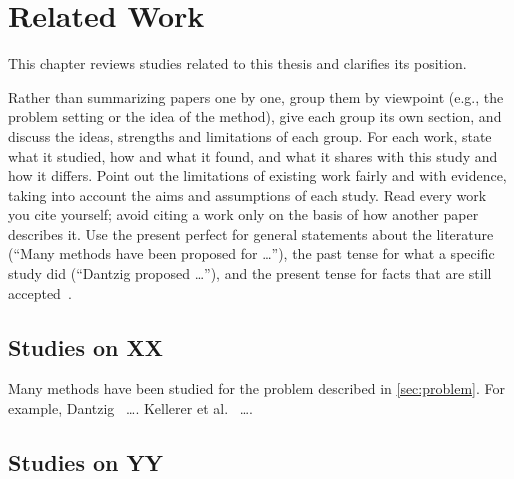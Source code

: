 \chapter{Related Work}
\label{chap:related-work}

This chapter reviews studies related to this thesis and clarifies its position.
\begin{writingnote}
Rather than summarizing papers one by one, group them by viewpoint (e.g., the problem setting or the idea of the method),
give each group its own section, and discuss the ideas, strengths and limitations of each group.
For each work, state what it studied, how and what it found, and what it shares with this study and how it differs.
Point out the limitations of existing work fairly and with evidence, taking into account the aims and assumptions of each study.
Read every work you cite yourself; avoid citing a work only on the basis of how another paper describes it.
Use the present perfect for general statements about the literature (``Many methods have been proposed for \ldots''),
the past tense for what a specific study did (``Dantzig proposed \ldots''),
and the present tense for facts that are still accepted~\cite{glasmandeal2010science,morleyphrasebank}.
\end{writingnote}

\section{Studies on XX}
\label{sec:related-a}

Many methods have been studied for the problem described in \cref{sec:problem}.
For example, Dantzig~\cite{dantzig1957discrete} \ldots.
Kellerer et al.~\cite{kellerer2004knapsack} \ldots.

\section{Studies on YY}
\label{sec:related-b}

